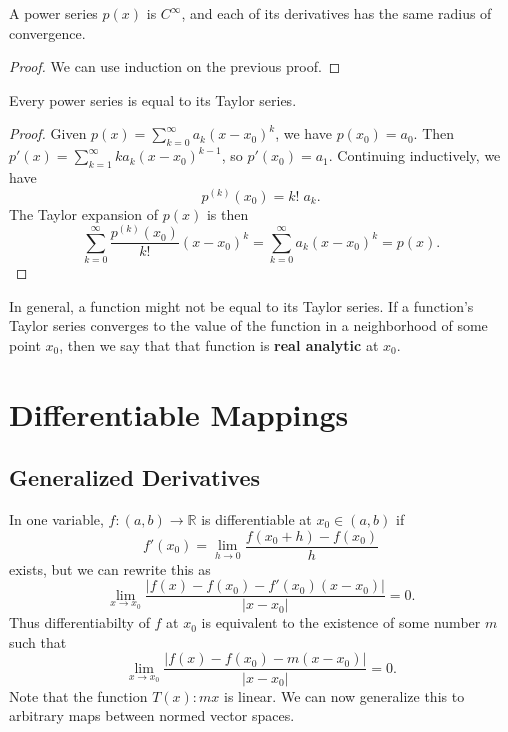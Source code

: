 \documentclass[10pt]{report}
\begin{document}
\begin{cor}
	A power series $p(x)$ is $C^{\infty}$, and each of its derivatives has the same radius of convergence.
\end{cor}
\begin{proof}
	We can use induction on the previous proof.
\end{proof}

\begin{prop}
	Every power series is equal to its Taylor series.
\end{prop}
\begin{proof}
	Given $p(x) = \sum_{k=0}^{\infty} a_k (x-x_0)^k$, we have $p(x_0) = a_0$. Then $p'(x) = \sum_{k=1}^{\infty} k a_k (x-x_0)^{k-1}$, so $p'(x_0) = a_1$. Continuing inductively, we have
	\[
		p^{(k)}(x_0) = k! \; a_k.
	\] The Taylor expansion of $p(x)$ is then
	\[
		\sum_{k=0}^{\infty} \frac{p^{(k)}(x_0)}{k!} (x-x_0)^k = \sum_{k=0}^{\infty} a_k (x-x_0)^k = p(x).
	\]
\end{proof}

\begin{note}{}{}
	In general, a function might not be equal to its Taylor series. If a function's Taylor series converges to the value of the function in a neighborhood of some point $x_0$, then we say that that function is \textbf{real analytic} at $x_0$.
\end{note}



\chapter{Differentiable Mappings}


\section{Generalized Derivatives}

In one variable, $f:(a,b) \to \mathbb{R}$ is differentiable at $x_0 \in (a,b)$ if
\[
	f'(x_0) = \lim_{h \to 0} \frac{f(x_0+h) - f(x_0)}{h} 
\] exists, but we can rewrite this as
\[
	\lim_{x \to x_0} \frac{|f(x)-f(x_0) - f'(x_0)(x-x_0)|}{|x-x_0|} =0.
\] Thus differentiabilty of $f$ at $x_0$ is equivalent to the existence of some number $m$ such that
\[
	\lim_{x \to x_0} \frac{|f(x)-f(x_0) - m(x-x_0)|}{|x-x_0|} =0.
\] Note that the function $T(x) : mx$ is linear.  We can now generalize this to arbitrary maps between normed vector spaces.
\end{document}

